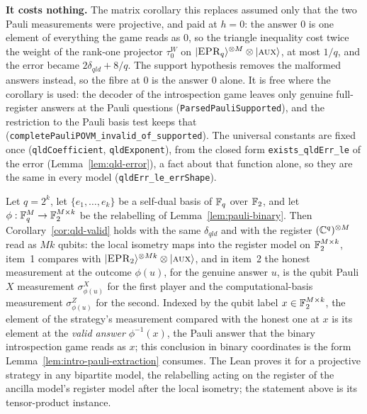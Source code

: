 \textbf{It costs nothing.} The matrix corollary this replaces assumed only that the two Pauli
measurements were projective, and paid at $h = 0$: the answer $0$ is one element of everything the
game reads as $0$, so the triangle inequality cost twice the weight of the rank-one projector
$\tau^W_0$ on $|\textsc{EPR}_q\rangle^{\otimes M} \otimes |\textsc{aux}\rangle$, at most $1/q$, and the error became
$2\delta_{qld} + 8/q$. The support hypothesis removes the malformed answers instead, so the fibre at
$0$ is the answer $0$ alone. It is free where the corollary is used: the decoder of the
introspection game leaves only genuine full-register answers at the Pauli questions
(\texttt{ParsedPauliSupported}), and the restriction to the Pauli basis test keeps that
(\texttt{completePauliPOVM\_invalid\_of\_supported}). The universal constants are fixed once
(\texttt{qldCoefficient}, \texttt{qldExponent}), from the closed form \texttt{exists\_qldErr\_le} of
the error (Lemma~\ref{lem:qld-error}), a fact about that function alone, so they are the same in
every model (\texttt{qldErr\_le\_errShape}).

\begin{corollary}
\label{cor:qld-binary}
\leanok
Let $q = 2^k$, let $\{e_1, \ldots, e_k\}$ be a self-dual basis of $\mathbb{F}_q$ over $\mathbb{F}_2$, and let
$\phi : \mathbb{F}_q^M \to \mathbb{F}_2^{M \times k}$ be the relabelling of Lemma~\ref{lem:pauli-binary}. Then
Corollary~\ref{cor:qld-valid} holds with the same $\delta_{qld}$ and with the register
$(\mathbb{C}^q)^{\otimes M}$ read as $M k$ qubits: the local isometry maps into the register model on
$\mathbb{F}_2^{M \times k}$, item~1 compares with $|\textsc{EPR}_2\rangle^{\otimes Mk} \otimes |\textsc{aux}\rangle$, and in item~2 the
honest measurement at the outcome $\phi(u)$, for the genuine answer $u$, is the qubit Pauli $X$
measurement $\sigma^X_{\phi(u)}$ for the first player and the computational-basis measurement
$\sigma^Z_{\phi(u)}$ for the second. Indexed by the qubit label $x \in \mathbb{F}_2^{M \times k}$, the
element of the strategy's measurement compared with the honest one at $x$ is its element at the
\emph{valid answer} $\phi^{-1}(x)$, the Pauli answer that the binary introspection game reads as
$x$; this conclusion in binary coordinates is the form Lemma~\ref{lem:intro-pauli-extraction}
consumes. The Lean proves it for a projective strategy in any bipartite
model, the relabelling acting on the register of the ancilla model's register model after the
local isometry; the statement above is its tensor-product instance.
\end{corollary}

